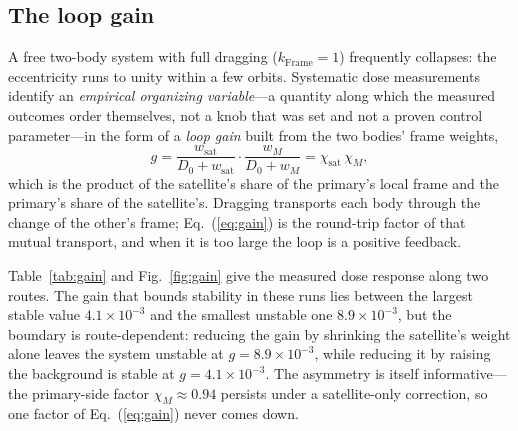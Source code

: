 \documentclass[aps,reprint,amsmath,amssymb,nofootinbib,superscriptaddress,floatfix]{revtex4-2}
\begin{document}
\subsection{The loop gain}
\label{sec:p2gain}

A free two-body system with full dragging ($k_{\mathrm{Frame}}=1$)
frequently collapses: the eccentricity runs to unity within a few
orbits.
Systematic dose measurements identify an \emph{empirical organizing
variable}---a quantity along which the measured outcomes order
themselves, not a knob that was set and not a proven control
parameter---in the form of a \emph{loop gain} built from the two
bodies' frame weights,
\begin{equation}
  g = \frac{w_{\mathrm{sat}}}{D_0+w_{\mathrm{sat}}}\cdot
      \frac{w_{M}}{D_0+w_{M}}
    = \chi_{\mathrm{sat}}\,\chi_{M},
  \label{eq:gain}
\end{equation}
which is the product of the satellite's share of the primary's local
frame and the primary's share of the satellite's.
Dragging transports each body through the change of the other's frame;
Eq.~(\ref{eq:gain}) is the round-trip factor of that mutual transport,
and when it is too large the loop is a positive feedback.

Table~\ref{tab:gain} and Fig.~\ref{fig:gain} give the measured dose
response along two routes.
The gain that bounds stability in these runs lies between the largest
stable value $4.1\times10^{-3}$ and the smallest unstable one
$8.9\times10^{-3}$, but the boundary is route-dependent: reducing the
gain by shrinking the satellite's weight alone leaves the system
unstable at $g=8.9\times10^{-3}$, while reducing it by raising the
background is stable at $g=4.1\times10^{-3}$.
The asymmetry is itself informative---the primary-side factor
$\chi_M\approx0.94$ persists under a satellite-only correction, so one
factor of Eq.~(\ref{eq:gain}) never comes down.
\end{document}

